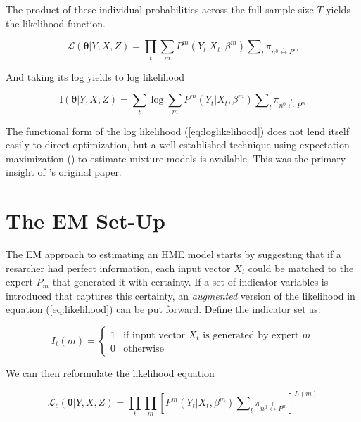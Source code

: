 \documentclass[12pt]{article}
\newcommand{\sumgateprod}[3]{\pi_{#1 \overset{#3}{\longleftrightarrow} #2}}
\newcommand{\shortsum}[1]{\sum \nolimits_{#1}}
\begin{document}
The product of these individual probabilities across the full sample size $T$ yields
the likelihood function.

\begin{equation} \label{eq:likelihood}
  \mathcal{L}(\boldsymbol{\theta}| Y, X, Z) = \prod_{t}\sum_{m}P^{m}(Y_{t}|X_{t}, \beta^{m}) \shortsum{l} \sumgateprod{n^{0}}{P^{m}}{l}
\end{equation}

And taking its log yields to log likelihood

\begin{equation} \label{eq:loglikelihood}
  \boldsymbol{l}(\boldsymbol{\theta}|Y, X, Z) = \sum_{t}\log\sum_{m}P^{m}(Y_{t}|X_{t},\beta^{m}) \shortsum{l} \sumgateprod{n^{0}}{P^{m}}{l}
\end{equation}

The functional form of the log likelihood (\ref{eq:loglikelihood}) does not
lend itself easily to direct optimization, but a well established
technique using expectation maximization (\cite{EM_DLR1977}) to estimate mixture
models is available. This was the primary insight of \cite{JordanJacobs1993}'s
original paper.





\section{The EM Set-Up} \label{sec:Estimation}

The EM approach to estimating an HME model starts by suggesting that if a
resarcher had perfect information, each input vector $X_{t}$ could be matched
to the expert $P_{m}$ that generated it with certainty. If a set of indicator
variables is introduced that captures this certainty, an \textit{augmented}
version of the likelihood in equation (\ref{eq:likelihood}) can be put forward.
Define the indicator set as:

\begin{equation} \label{eq:indicator}
  I_{t}(m) = \begin{cases} 
     1 & \textrm{if input vector $X_{t}$ is generated by expert $m$} \\
     0 & \textrm{otherwise}
             \end{cases}
\end{equation}

We can then reformulate the likelihood equation

\begin{equation}  \label{eq:likelihood}
  \mathcal{L}_{c}(\boldsymbol{\theta}|Y, X, Z) = \prod_{t} \prod_{m} \left[ P^{m}(Y_{t}|X_{t},\beta^{m}) \shortsum{l} \sumgateprod{n^{0}}{P^{m}}{l} \right]^{I_{t}(m)}
\end{equation}
\end{document}
